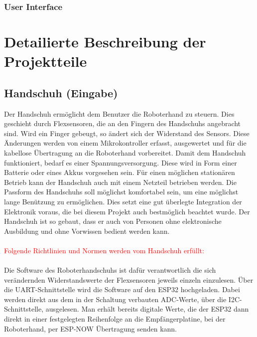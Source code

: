 \documentclass[11pt]{article}
\begin{document}
\subsubsection{User Interface}


\section{Detailierte Beschreibung der Projektteile}

\subsection{Handschuh (Eingabe)}
Der Handschuh ermöglicht dem Benutzer die Roboterhand zu steuern. 
Dies geschieht durch Flexsensoren, die an den Fingern des Handschuhs angebracht sind. Wird ein Finger gebeugt, 
so ändert sich der Widerstand des Sensors. Diese Änderungen werden von einem Mikrokontroller erfasst, ausgewertet 
und für die kabellose Übertragung an die Roboterhand vorbereitet. Damit dem Handschuh funktioniert, bedarf es 
einer Spannungsversorgung. Diese wird in Form einer Batterie oder eines Akkus vorgesehen sein. Für einen möglichen 
stationären Betrieb kann der Handschuh auch mit einem Netzteil betrieben werden. Die Passform des Handschuhs soll 
möglichst komfortabel sein, um eine möglichst lange Benützung zu ermöglichen. Dies setzt eine gut überlegte Integration 
der Elektronik voraus, die bei diesem Projekt auch bestmöglich beachtet wurde. Der Handschuh ist so gebaut, dass er 
auch von Personen ohne elektronische Ausbildung und ohne Vorwissen bedient werden kann.\\
\\
\textcolor{red}{Folgende Richtlinien und Normen werden vom Handschuh erfüllt:}\\
\\
Die Software des Roboterhandschuhs ist dafür verantwortlich die sich verändernden Widerstandswerte der Flexsensoren 
jeweils einzeln einzulesen. Über die UART-Schnittstelle wird die Software auf den ESP32 hochgeladen. Dabei werden 
direkt aus dem in der Schaltung verbauten ADC-Werte, über die I2C-Schnittstelle, ausgelesen. Man erhält bereits digitale 
Werte, die der ESP32 dann direkt in einer festgelegten Reihenfolge an die Empfängerplatine, bei der Roboterhand, per 
ESP-NOW Übertragung senden kann.
\end{document}
